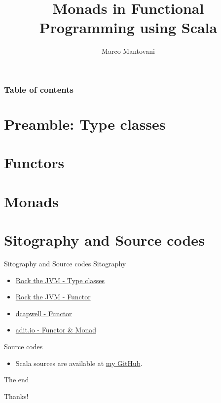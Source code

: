 \documentclass{beamer}
\title[Monads in Functional Programming]{Monads in Functional Programming using Scala}
\author{Marco Mantovani}
\begin{document}
	
	\begin{frame}
		\maketitle
	\end{frame}
	
	\begin{frame}
		\frametitle{Table of contents}
		\tableofcontents
	\end{frame}
	
	\section{Preamble: Type classes}
	
	
	\section{Functors}
	
			
	\section{Monads}
	

	\section{Sitography  and Source codes}
	\begin{frame}{Sitography  and Source codes}
		Sitography  
		\begin{itemize}
			\item \href{https://blog.rockthejvm.com/why-are-typeclasses-useful/}{Rock the JVM - Type classes}
			\item \href{https://blog.rockthejvm.com/what-the-functor/}{Rock the JVM - Functor}
			\item \href{http://dcapwell.github.io/scala-tour/Functor.html}{dcapwell - Functor}
			\item \href{https://adit.io/posts/2013-04-17-functors,\_applicatives,\_and\_monads\_in\_pictures.html}{adit.io - Functor \& Monad}
		\end{itemize}
	
		Source codes
		\begin{itemize}
			\item Scala sources are available at \href{https://github.com/Tovy97/TypeclassFunctorMonad\_Scala}{my GitHub}.
		\end{itemize}
	\end{frame}

	\begin{frame}{The end}	
		\begin{center}
			Thanks!
		\end{center}
	\end{frame}
\end{document}
